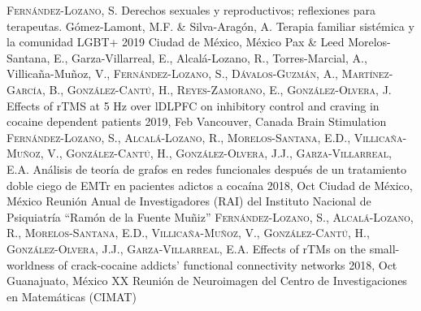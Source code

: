 \vspace{-3mm}
{
\setlength\tabcolsep{0pt} \setlength{\extrarowheight}{0pt}%
\begin{itemize}[leftmargin=5ex, nosep, noitemsep, itemindent=-13pt,
    label=\raisebox{0.25ex}{\tiny$\bullet$}]%
    \vspace{-1.8mm}%
    \cvchapt
        {\scshape{Fernández-Lozano, S.}}
        {Derechos sexuales y reproductivos; reflexiones para terapeutas.}
        {Gómez-Lamont, M.F. \& Silva-Aragón, A.}
        {Terapia familiar sistémica y la comunidad LGBT+}
        {2019}
        {Ciudad de México, México}
        {Pax \& Leed}
    \cvposter
        {Morelos-Santana, E., Garza-Villarreal, E., Alcalá-Lozano, R.,
            Torres-Marcial, A., Villicaña-Muñoz, V., \scshape{Fernández-Lozano,
            S.}, Dávalos-Guzmán, A., Martínez-García, B., González-Cantú, H.,
            Reyes-Zamorano, E., González-Olvera, J.}
        {Effects of rTMS at 5 Hz over lDLPFC on inhibitory control and craving
            in cocaine dependent patients}
        {2019, Feb}
        {Vancouver, Canada}
        {Brain Stimulation}
    \cvposter
        {\scshape{Fernández-Lozano, S.}, Alcalá-Lozano, R., Morelos-Santana, E.D.,
            Villicaña-Muñoz, V., González-Cantú, H., González-Olvera, J.J.,
        Garza-Villarreal, E.A.}
        {Análisis de teoría de grafos en redes funcionales después de un
            tratamiento doble ciego de EMTr en pacientes adictos a cocaína}
        {2018, Oct}
        {Ciudad de México, México}
        {Reunión Anual de Investigadores (RAI) del Instituto Nacional de Psiquiatría ``Ramón de la Fuente Muñiz''}
    \cvposter
        {\scshape{Fernández-Lozano, S.}, Alcalá-Lozano, R., Morelos-Santana, E.D.,
            Villicaña-Muñoz, V., González-Cantú, H., González-Olvera, J.J.,
        Garza-Villarreal, E.A.}
        {Effects of rTMs on the small-worldness of crack-cocaine addicts' functional connectivity networks}
        {2018, Oct}
        {Guanajuato, México}
        {XX Reunión de Neuroimagen del Centro de Investigaciones en Matemáticas (CIMAT)}
\end{itemize}
}
